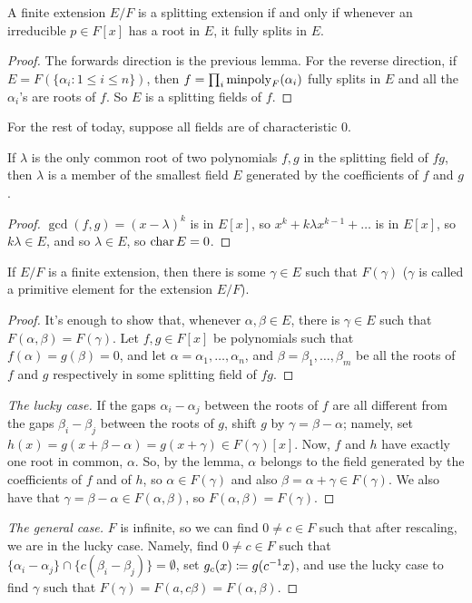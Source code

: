 \begin{theorem}
    A finite extension $E/F$ is a splitting extension if and only if whenever an irreducible $p \in F[x]$ has a root in $E$, it fully splits in $E$.
\end{theorem}
\begin{proof}
    The forwards direction is the previous lemma. For the reverse direction, if $E = F(\{\alpha_i : 1 \leq i \leq n\})$, then $f = \prod_i \operatorname{minpoly}_F(\alpha_i)$ fully splits in $E$ and all the $\alpha_i$'s are roots of $f$. So $E$ is a splitting fields of $f$.
\end{proof}
For the rest of today, suppose all fields are of characteristic $0$.
\begin{lemma}
    If $\lambda$ is the only common root of two polynomials $f, g$ in the splitting field of $fg$, then $\lambda$ is a member of the smallest field $E$ generated by the coefficients of $f$ and $g$.
\end{lemma}
\begin{proof}
    $\gcd(f, g) = (x - \lambda)^k$ is in $E[x]$, so $x^k + k \lambda x^{k-1} + \dots$ is in $E[x]$, so $k\lambda \in E$, and so $\lambda \in E$, so $\operatorname{char} E = 0$.
\end{proof}
\begin{theorem}
    If $E/F$ is a finite extension, then there is some $\gamma \in E$ such that $F(\gamma)$ ($\gamma$ is called a primitive element for the extension $E/F$).
\end{theorem}
\begin{proof}
    It's enough to show that, whenever $\alpha, \beta \in E$, there is $\gamma \in E$ such that $F(\alpha, \beta) = F(\gamma)$. Let $f, g \in F[x]$ be polynomials such that $f(\alpha) = g(\beta) = 0$, and let $\alpha = \alpha_1, \dots, \alpha_n$, and $\beta = \beta_1, \dots, \beta_m$ be all the roots of $f$ and $g$ respectively in some splitting field of $fg$.
\end{proof}
\begin{proof}[The lucky case]
    If the gaps $\alpha_i - \alpha_j$ between the roots of $f$ are all different from the gaps $\beta_i - \beta_j$ between the roots of $g$, shift $g$ by $\gamma = \beta - \alpha$; namely, set $h(x) = g(x + \beta - \alpha) = g(x + \gamma) \in F(\gamma)[x]$. Now, $f$ and $h$ have exactly one root in common, $\alpha$. So, by the lemma, $\alpha$ belongs to the field generated by the coefficients of $f$ and of $h$, so $\alpha \in F(\gamma)$ and also $\beta = \alpha + \gamma \in F(\gamma)$. We also have that $\gamma = \beta - \alpha \in F(\alpha, \beta)$, so $F(\alpha, \beta) = F(\gamma)$.
\end{proof}
\begin{proof}[The general case]
    $F$ is infinite, so we can find $0 \neq c \in F$ such that after rescaling, we are in the lucky case. Namely, find $0 \neq c \in F$ such that $\{\alpha_i - \alpha_j\} \cap \{c(\beta_i - \beta_j)\} = \emptyset$, set $g_c(x) \coloneq g(c^{-1} x)$, and use the lucky case to find $\gamma$ such that $F(\gamma) = F(a, c \beta) = F(\alpha, \beta)$.
\end{proof}